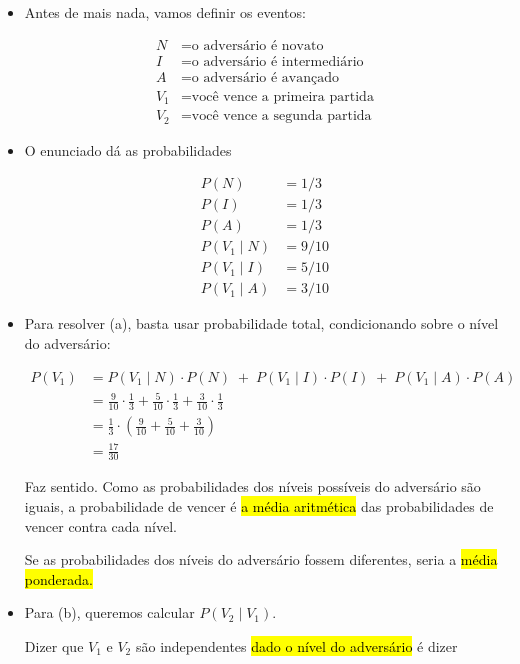 \documentclass[
  11pt]{report}
\begin{document}
\begin{itemize}
\item
  Antes de mais nada, vamos definir os eventos:

  \[
  \begin{aligned}
    N &= \text{o adversário é novato} \\
    I &= \text{o adversário é intermediário} \\
    A &= \text{o adversário é avançado} \\
    V_1 &= \text{você vence a primeira partida} \\
    V_2 &= \text{você vence a segunda partida} 
  \end{aligned}
  \]
\item
  O enunciado dá as probabilidades

  \[
  \begin{aligned}
  P(N) &= 1/3 \\
  P(I) &= 1/3 \\
  P(A) &= 1/3 \\
  P(V_1 \mid N) &= 9/10 \\
  P(V_1 \mid I) &= 5/10 \\
  P(V_1 \mid A) &= 3/10
  \end{aligned}
  \]
\item
  Para resolver (a), basta usar probabilidade total, condicionando sobre o nível do adversário:

  \[
  \begin{aligned}
  P(V_1) 
  &= 
  P(V_1 \mid N) \cdot P(N) \;+\;
  P(V_1 \mid I) \cdot P(I) \;+\;
  P(V_1 \mid A) \cdot P(A)
  \\
  &= 
  \frac{9}{10} \cdot \frac{1}{3} + 
  \frac{5}{10} \cdot \frac{1}{3} + 
  \frac{3}{10} \cdot \frac{1}{3} \\
  &= 
  \frac{1}{3} \cdot \left(
  \frac{9}{10} + 
  \frac{5}{10} + 
  \frac{3}{10} \right) \\
  &=
  \frac{17}{30}
  \end{aligned}
  \]

  Faz sentido. Como as probabilidades dos níveis possíveis do adversário são iguais, a probabilidade de vencer é {\hl{a média aritmética}} das probabilidades de vencer contra cada nível.

  Se as probabilidades dos níveis do adversário fossem diferentes, seria a {\hl{média ponderada.}}
\item
  Para (b), queremos calcular $P(V_2 \mid V_1)$.

  Dizer que $V_1$ e $V_2$ são independentes {\hl{dado o nível do adversário}} é dizer


\end{itemize}
\end{document}
